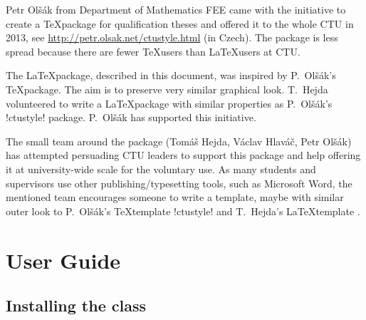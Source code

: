 \documentclass[twoside]{ctuthesis}
\theoremstyle{plain}
\theoremstyle{definition}
\theoremstyle{note}
\begin{document}
Petr Olšák from Department of Mathematics FEE came with the initiative to create a \TeX\@ package for qualification theses and offered it to the whole CTU in 2013, see \url{http://petr.olsak.net/ctustyle.html} (in Czech). The package is less spread because there are fewer \TeX\@ users than \LaTeX\@ users at CTU.

The \ctuclsname\@ \LaTeX\@ package, described in this document, was inspired by P.~Olšák's \TeX\@ package. The aim is to preserve very similar graphical look. T.~Hejda volunteered to write a \LaTeX\@ package with similar properties as P.~Olšák's \ctulst!ctustyle! package. P.~Olšák has supported this initiative.

The small team around the \ctuclsname\@ package (Tomáš Hejda, Václav Hlaváč, Petr Olšák) has attempted persuading CTU leaders to support this package and help offering it at university-wide scale for the voluntary use. As many students and supervisors use other publishing/typesetting tools, such as Microsoft Word, the mentioned team encourages someone to write a template, maybe with similar outer look to P.~Olšák's \TeX\@ template \ctulst!ctustyle! and T.~Hejda's \LaTeX\@ template \ctuclsname. 






\chapter{User Guide}
\label{chap:ug}





\section{Installing the class}
\end{document}

